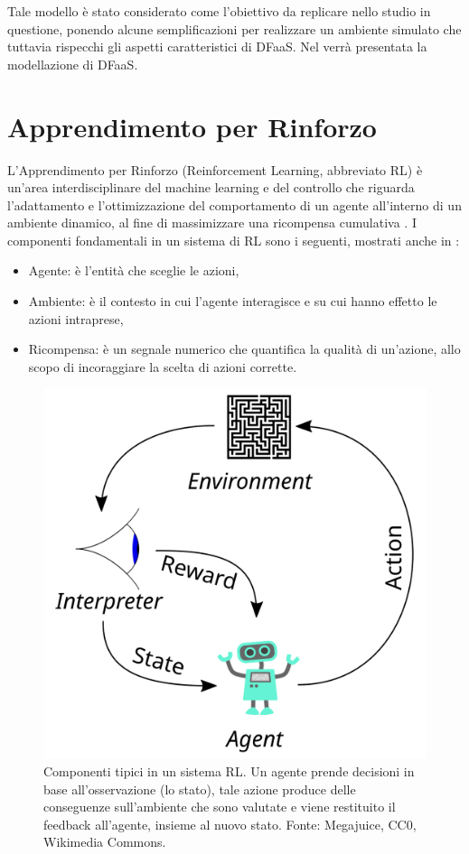 Tale modello è stato considerato come l'obiettivo da replicare nello studio in questione, ponendo alcune semplificazioni per realizzare un ambiente simulato che tuttavia rispecchi gli aspetti caratteristici di DFaaS. Nel  verrà presentata la modellazione di DFaaS.

\section{Apprendimento per Rinforzo}

L'Apprendimento per Rinforzo (Reinforcement Learning, abbreviato RL) è un'area interdisciplinare del machine learning e del controllo che riguarda l'adattamento e l'ottimizzazione del comportamento di un agente all'interno di un ambiente dinamico, al fine di massimizzare una ricompensa cumulativa \cite{Sutton2018}. I componenti fondamentali in un sistema di RL sono i seguenti, mostrati anche in :

\begin{itemize}
    \item Agente: è l'entità che sceglie le azioni,

    \item Ambiente: è il contesto in cui l'agente interagisce e su cui hanno effetto le azioni intraprese,

    \item Ricompensa: è un segnale numerico che quantifica la qualità di un'azione, allo scopo di incoraggiare la scelta di azioni corrette.
\end{itemize}

\begin{figure}
    \centering
    \includegraphics[width=.5\linewidth]{assets/2/rl_components.png}
    \caption[Componenti tipici in un sistema RL]{Componenti tipici in un sistema RL. Un agente prende decisioni in base all'osservazione (lo stato), tale azione produce delle conseguenze sull'ambiente che sono valutate e viene restituito il feedback all'agente, insieme al nuovo stato. Fonte: Megajuice, CC0, Wikimedia Commons.}
    \label{fig:2_rl_components}
\end{figure}

